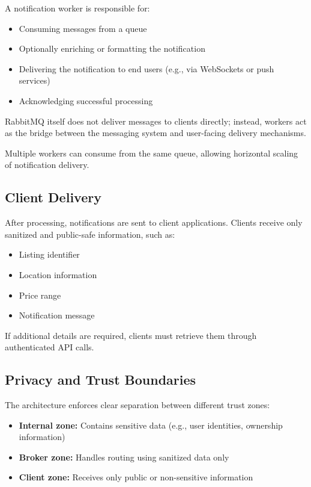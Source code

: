 A notification worker is responsible for:

\begin{itemize}
    \item Consuming messages from a queue
    \item Optionally enriching or formatting the notification
    \item Delivering the notification to end users (e.g., via WebSockets or push services)
    \item Acknowledging successful processing
\end{itemize}

RabbitMQ itself does not deliver messages to clients directly; instead, workers act as the bridge between the messaging system and user-facing delivery mechanisms.

Multiple workers can consume from the same queue, allowing horizontal scaling of notification delivery.

\subsection{Client Delivery}

After processing, notifications are sent to client applications. Clients receive only sanitized and public-safe information, such as:

\begin{itemize}
    \item Listing identifier
    \item Location information
    \item Price range
    \item Notification message
\end{itemize}

If additional details are required, clients must retrieve them through authenticated API calls.

\subsection{Privacy and Trust Boundaries}

The architecture enforces clear separation between different trust zones:

\begin{itemize}
    \item \textbf{Internal zone:} Contains sensitive data (e.g., user identities, ownership information)
    \item \textbf{Broker zone:} Handles routing using sanitized data only
    \item \textbf{Client zone:} Receives only public or non-sensitive information
\end{itemize}

